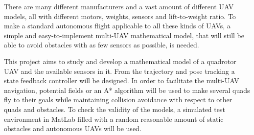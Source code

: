 \documentclass[journal]{IEEEtran}
\begin{document}
 There are many different manufacturers and a vast amount of different UAV models, all with different motors, weights, sensors and lift-to-weight ratio. To make a standard autonomous flight applicable to all these kinds of UAVs, a simple and easy-to-implement multi-UAV mathematical model, that will still be able to avoid obstacles with as few sensors as possible, is needed.

This project aims to study and develop a mathematical model of a quadrotor UAV and the available sensors in it.  From the trajectory and pose tracking a state feedback controller will be designed. In order to facilitate the multi-UAV navigation, potential fields or an A* algorithm will be used to make several quads fly to their goals while maintaining collision avoidance with respect to other quads and obstacles. To check the validity of the models, a simulated test environment in MatLab filled with a random reasonable amount of static obstacles and autonomous UAVs will be used.
\hfill 


%
%


%
%
\end{document}
